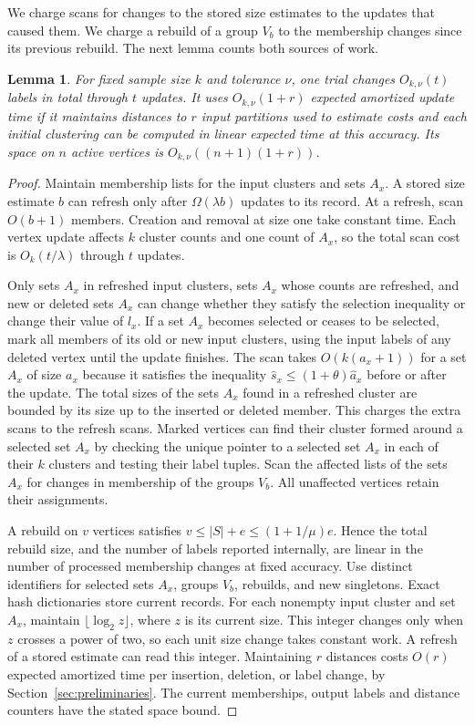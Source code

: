 \documentclass[11pt]{article}
\newtheorem{lemma}[theorem]{Lemma}
\begin{document}
We charge scans for changes to the stored size estimates to the updates that
caused them. We charge a rebuild of a group $V_b$ to the membership changes
since its previous rebuild. The next lemma counts both sources of
work.

\begin{lemma}\label{lem:dynamic-work}
For fixed sample size $k$ and tolerance $\nu$, one trial changes
$O_{k,\nu}(t)$ labels in total through $t$ updates. It uses
$O_{k,\nu}(1+r)$ expected amortized update time if it maintains
distances to $r$ input partitions used to estimate costs and each initial clustering can be computed in linear
expected time at this accuracy. Its space on $n$ active vertices is
$O_{k,\nu}((n+1)(1+r))$.
\end{lemma}
\begin{proof}
Maintain membership lists for the input clusters and sets $A_x$. A
stored size estimate $b$ can refresh only after $\Omega(\lambda b)$
updates to its record. At a refresh, scan $O(b+1)$ members.
Creation and removal at size one take constant time. Each vertex
update affects $k$ cluster counts and one count of $A_x$, so the total
scan cost is $O_k(t/\lambda)$ through $t$ updates.

Only sets $A_x$ in refreshed input clusters, sets $A_x$ whose counts are refreshed,
and new or deleted sets $A_x$ can change whether they satisfy the selection inequality or change their
value of $l_x$. If a set $A_x$ becomes selected or ceases to be selected, mark all members of
its old or new input clusters, using the input labels of any deleted
vertex until the update finishes. The scan takes $O(k(a_x+1))$
for a set $A_x$ of size $a_x$ because it satisfies the inequality $\widehat
s_x\le(1+\theta)\widehat a_x$ before or after
the update. The total sizes of the sets $A_x$ found in a refreshed
cluster are bounded by its size up to the inserted or deleted member.
This charges the extra scans to the refresh scans. Marked vertices
can find their cluster formed around a selected set $A_x$ by checking the unique
pointer to a selected set $A_x$ in
each of their $k$ clusters and testing their label tuples. Scan the
affected lists of the sets $A_x$ for changes in membership of the groups $V_b$. All unaffected vertices
retain their assignments.

A rebuild on $v$ vertices satisfies $v\le |S|+e\le(1+1/\mu)e$.
Hence the total rebuild size, and the number of labels reported
internally, are linear in the number of processed membership
changes at fixed accuracy. Use distinct identifiers for selected sets $A_x$,
groups $V_b$, rebuilds, and new singletons. Exact hash dictionaries store
current records. For each nonempty input cluster and set $A_x$,
maintain $\lfloor\log_2 z\rfloor$, where $z$ is its current size.
This integer changes only when $z$ crosses a power of two, so each
unit size change takes constant work. A refresh of a stored estimate
can read this integer. Maintaining $r$ distances costs $O(r)$ expected amortized
time per insertion, deletion, or label change, by
Section~\ref{sec:preliminaries}. The current memberships, output
labels and distance counters have the stated space bound.
\end{proof}
\end{document}
